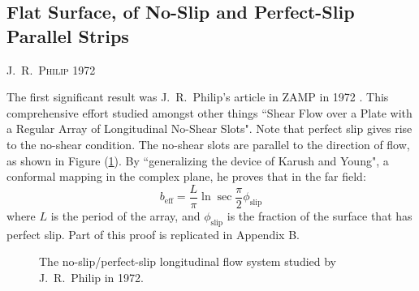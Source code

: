 \documentclass[12pt, a4paper, twoside, openright]{book}
\newcommand{\beff}{\ensuremath{b_{\mathrm{eff}}}}
\newcommand{\phislip}{\ensuremath{\phi_{\mathrm{slip}}}}
\newcommand{\paper}[1]
         {\colorbox[gray]{0.8}{ \textsc{#1}}
         
         }
\begin{document}
\subsection{Flat Surface, of No-Slip and Perfect-Slip \\ Parallel Strips}

\paper{J.\ R.\ Philip 1972}
The first significant result was J.\ R.\ Philip's article in ZAMP in 1972 \cite{Philip1972}.  This comprehensive effort studied amongst other things ``Shear Flow over a Plate with a Regular Array of Longitudinal No-Shear Slots".  Note that perfect slip gives rise to the no-shear condition.  The no-shear slots are parallel to the direction of flow, as shown in Figure (\ref{JRPhilip}).   By ``generalizing the device of Karush and Young", a conformal mapping in the complex plane, he proves that in the far field:
\begin{equation}
\beff= \frac{L}{\pi}	\ln \sec \frac{\pi}{2} \phislip
\end{equation}
where $L$ is the period of the array, and $\phislip$ is the fraction of the surface that has perfect slip. Part of this proof is replicated in Appendix B. 

\begin{figure}[ht]
\centering
{}
\caption{The no-slip/perfect-slip longitudinal flow system studied by J.~R.~Philip
in 1972.} \label{JRPhilip}
\end{figure}
\end{document}
